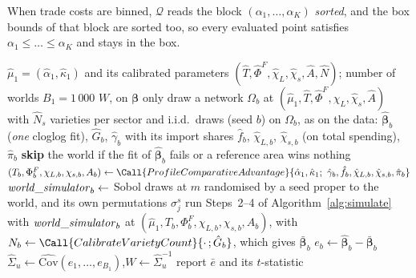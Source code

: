 When trade costs are binned, $\mathcal{Q}$ reads the block $(\alpha_1,\dots,\alpha_K)$ \emph{sorted}, and the box bounds of that block are sorted too, so every evaluated point satisfies $\alpha_1\le\dots\le\alpha_K$ and stays in the box.

\begin{algorithm}[H]
\caption{\textsc{WorldWeightMatrix}: the weighting matrix from fake worlds}
\label{alg:W}
\small
\begin{algorithmic}[1]
\Require $\hat\mu_1=(\hat\alpha_1,\hat\kappa_1)$ and its calibrated parameters $(\hat T,\hat\Phi^F,\hat\chi_L,\hat\chi_s,\hat A,\hat N)$; number of worlds $B_1=1\,000$
\Ensure $W$, on $\boldsymbol\beta$ only
    \State draw a network $\Omega_b$ at $(\hat\mu_1,\hat T,\hat\Phi^F,\hat\chi_L,\hat\chi_s,\hat A)$ with $\hat N_s$ varieties per sector and i.i.d.\ draws (seed $b$)
    \State on $\Omega_b$, as on the data: $\hat{\boldsymbol\beta}_b$ (\emph{one} cloglog fit), $\hat G_b$, $\hat\gamma_b$ with its import shares $\hat f_b$, $\hat\chi_{L,b}$, $\hat\chi_{s,b}$ (on total spending), $\hat\pi_b$
    \State \textbf{skip} the world if the fit of $\hat{\boldsymbol\beta}_b$ fails or a reference area wins nothing
    \State $(T_b,\Phi^F_b,\chi_{L,b},\chi_{s,b},A_b)\gets\Call{ProfileComparativeAdvantage}{\hat\alpha_1,\hat\kappa_1;\ \hat\gamma_b,\hat f_b,\hat\chi_{L,b},\hat\chi_{s,b},\hat\pi_b}$
    \State $\mathit{world\_simulator}_b\gets$ Sobol draws at $m$ randomised by a seed proper to the world, and its own permutations $\sigma^s_j$
    \State run Steps~2--4 of Algorithm~\ref{alg:simulate} with $\mathit{world\_simulator}_b$ at $(\hat\mu_1,T_b,\Phi^F_b,\chi_{L,b},\chi_{s,b},A_b)$, with $N_b\gets\Call{CalibrateVarietyCount}{\cdot\,;\hat G_b}$, which gives $\bar{\boldsymbol\beta}_b$
    \State $e_b\gets\hat{\boldsymbol\beta}_b-\bar{\boldsymbol\beta}_b$
\EndFor
\State $\hat\Sigma_u\gets\widehat{\mathrm{Cov}}(e_1,\dots,e_{B_1})$,\quad $W\gets\hat\Sigma_u^{-1}$
\State report $\bar e$ and its $t$-statistic
\end{algorithmic}
\end{algorithm}

